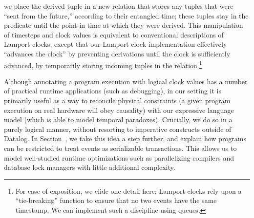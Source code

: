 \noindent we place the derived tuple in a new relation  that
stores any tuples that were ``sent from the future,'' according to their
entangled time; these tuples stay in the  predicate until the
point in time at which they were derived.  
This manipulation of timesteps and clock values is equivalent to conventional
descriptions of Lamport clocks, except that our Lamport clock implementation
effectively ``advances the clock'' by preventing derivations until the clock is
sufficiently advanced, by temporarily storing incoming tuples in the
 relation.\footnote{For ease of exposition, we elide one
detail here: Lamport clocks rely upon a ``tie-breaking'' function to ensure
that no two events have the same timestamp.  We can implement such a discipline
using queues.}

Although annotating a program execution with logical clock values has
a number of practical runtime applications (such as debugging), in our
setting it is primarily useful as a way to reconcile physical
constraints (a given program execution on real hardware will obey
causality) with our expressive language model (which is able to model
temporal paradoxes).  Crucially, we do so in a purely logical manner,
without resorting to imperative constructs outside of Datalog.  In
Section~, we take this idea a step further, and explain
how \lang programs can be restricted to treat events as serializable
transactions.  This allows us to model well-studied runtime
optimizations such as parallelizing compilers and database lock
managers with little additional complexity.


